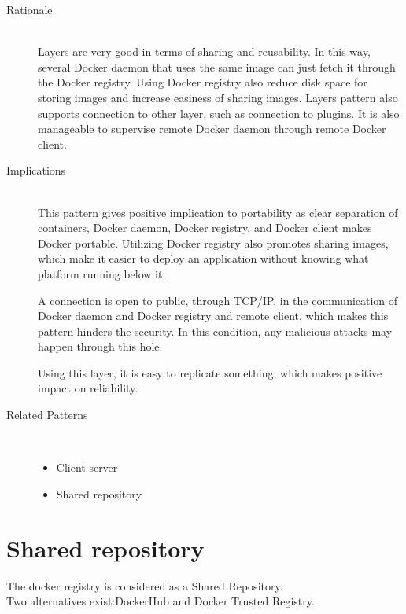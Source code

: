 \begin{description}
\item [Rationale] ~\\
Layers are very good in terms of sharing and reusability. In this way, several
Docker daemon that uses the same image can just fetch it through the Docker
registry. Using Docker registry also reduce disk space for storing images and
increase easiness of sharing images. Layers pattern also supports connection to
other layer, such as connection to plugins. It is also manageable to supervise
remote Docker daemon through remote Docker client.

\item [Implications]~\\
This pattern gives positive implication to portability as clear separation of
containers, Docker daemon, Docker registry, and Docker client makes Docker
portable. Utilizing Docker registry also promotes sharing images, which make it
easier to deploy an application without knowing what platform running below it.

A connection is open to public, through TCP/IP, in the communication of Docker
daemon and Docker registry and remote client, which makes this pattern hinders
the security. In this condition, any malicious attacks may happen through this
hole.

Using this layer, it is easy to replicate something, which makes positive impact
on reliability.

\item [Related Patterns]~
\begin{itemize}
	\item Client-server
	\item Shared repository
\end{itemize}
\end{description}



\section{Shared repository}

The docker registry is considered as a Shared Repository. \\
Two alternatives exist:DockerHub and Docker Trusted Registry. \\

